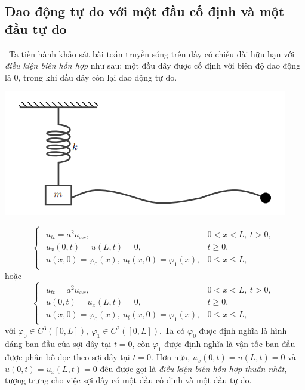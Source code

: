 \documentclass[10pt, a4paper]{article}
\begin{document}
	\subsection{Dao động tự do với một đầu cố định và một đầu tự do}
	\vspace{2mm}
	\quad\,\,\,Ta tiến hành khảo sát bài toán truyền sóng trên dây có chiều dài hữu hạn với \textit{điều kiện biên hỗn hợp} như sau: một đầu dây được cố định với biên độ dao động là 0, trong khi đầu dây còn lại dao động tự do. \begin{center}
		\includegraphics[width=0.4\linewidth]{freeOscillation.png}
	\end{center}
	\begin{tcolorbox}[enhanced,colback=blue!5!white,colframe=blue!75!black,sharp corners=all,shadow={0mm}{0mm}{-1.5mm}%
		{fill=blue!75!red,opacity=0.3},title=\textbf{Dạng của bài toán}]
		$$\begin{cases}
			\begin{array}{ll}
				u_{tt}=a^2u_{xx}, & 0<x<L,~t>0,\\
				u_x(0,t)=u(L,t)=0, & t\ge0,\\
				u(x,0)=\varphi_0(x),~u_t(x,0)=\varphi_1(x), & 0\le x\le L,
			\end{array}
		\end{cases}$$
		hoặc $$\begin{cases}
			\begin{array}{ll}
				u_{tt}=a^2u_{xx}, & 0<x<L,~t>0,\\
				u(0,t)=u_x(L,t)=0, & t\ge0,\\
				u(x,0)=\varphi_0(x),~u_t(x,0)=\varphi_1(x), & 0\le x\le L,
			\end{array}
		\end{cases}$$
		với $\varphi_0\in C^3([0,L]),~\varphi_1\in C^2([0,L])$.\vskip7pt
		\quad Ta có $\varphi_0$ được định nghĩa là hình dáng ban đầu của sợi dây tại $t=0$, còn $\varphi_1$ được định nghĩa là vận tốc ban đầu được phân bố dọc theo sợi dây tại $t=0$.\vskip7pt
		\quad Hơn nữa, $u_x(0,t)=u(L,t)=0$ và $u(0,t)=u_x(L,t)=0$ đều được gọi là \textit{điều kiện biên hỗn hợp thuần nhất}, tượng trưng cho việc sợi dây có một đầu cố định và một đầu tự do.
	\end{tcolorbox}
	\vspace{2mm}
	
\end{document}
